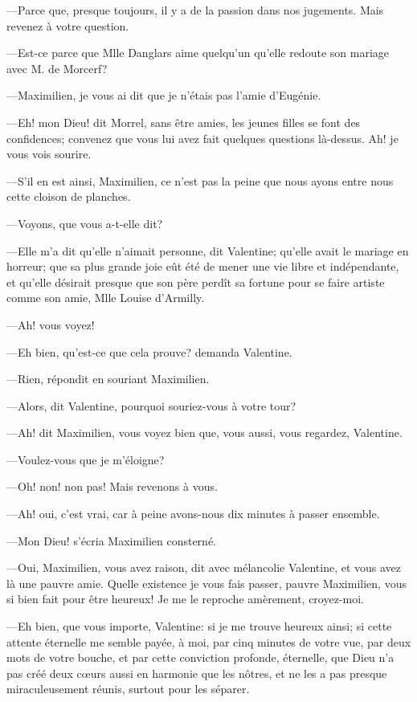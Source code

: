—Parce que, presque toujours, il y a de la passion dans nos jugements. Mais revenez à votre question. 

—Est-ce parce que Mlle Danglars aime quelqu'un qu'elle redoute son mariage avec M. de Morcerf? 

—Maximilien, je vous ai dit que je n'étais pas l'amie d'Eugénie. 

—Eh! mon Dieu! dit Morrel, sans être amies, les jeunes filles se font des confidences; convenez que vous lui avez fait quelques questions là-dessus. Ah! je vous vois sourire. 

—S'il en est ainsi, Maximilien, ce n'est pas la peine que nous ayons entre nous cette cloison de planches. 

—Voyons, que vous a-t-elle dit? 

—Elle m'a dit qu'elle n'aimait personne, dit Valentine; qu'elle avait le mariage en horreur; que sa plus grande joie eût été de mener une vie libre et indépendante, et qu'elle désirait presque que son père perdît sa fortune pour se faire artiste comme son amie, Mlle Louise d'Armilly. 

—Ah! vous voyez! 

—Eh bien, qu'est-ce que cela prouve? demanda Valentine. 

—Rien, répondit en souriant Maximilien. 

—Alors, dit Valentine, pourquoi souriez-vous à votre tour? 

—Ah! dit Maximilien, vous voyez bien que, vous aussi, vous regardez, Valentine. 

—Voulez-vous que je m'éloigne? 

—Oh! non! non pas! Mais revenons à vous. 

—Ah! oui, c'est vrai, car à peine avons-nous dix minutes à passer ensemble. 

—Mon Dieu! s'écria Maximilien consterné. 

—Oui, Maximilien, vous avez raison, dit avec mélancolie Valentine, et vous avez là une pauvre amie. Quelle existence je vous fais passer, pauvre Maximilien, vous si bien fait pour être heureux! Je me le reproche amèrement, croyez-moi. 

—Eh bien, que vous importe, Valentine: si je me trouve heureux ainsi; si cette attente éternelle me semble payée, à moi, par cinq minutes de votre vue, par deux mots de votre bouche, et par cette conviction profonde, éternelle, que Dieu n'a pas créé deux cœurs aussi en harmonie que les nôtres, et ne les a pas presque miraculeusement réunis, surtout pour les séparer. 


